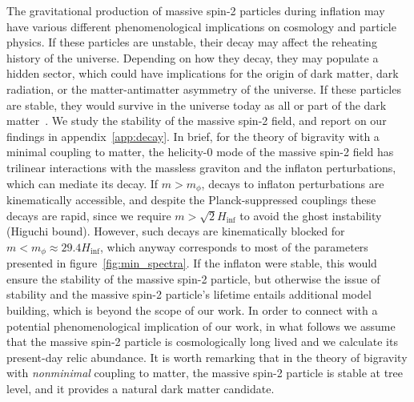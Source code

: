 \documentclass[11pt,a4paper]{article}
\newcommand{\fref}[1]{figure~\ref{#1}}
\newcommand{\aref}[1]{appendix~\ref{#1}}
\begin{document}
The gravitational production of massive spin-2 particles during inflation may have various different phenomenological implications on cosmology and particle physics.  If these particles are unstable, their decay may affect the reheating history of the universe.  Depending on how they decay, they may populate a hidden sector, which could have implications for the origin of dark matter, dark radiation, or the matter-antimatter asymmetry of the universe.  If these particles are stable, they would survive in the universe today as all or part of the dark matter~\cite{Babichev:2016bxi}.  We study the stability of the massive spin-2 field, and report on our findings in \aref{app:decay}.  In brief, for the theory of bigravity with a minimal coupling to matter, the helicity-0 mode of the massive spin-2 field has trilinear interactions with the massless graviton and the inflaton perturbations, which can mediate its decay.  If $m > m_\phi$, decays to inflaton perturbations are kinematically accessible, and despite the Planck-suppressed couplings these decays are rapid, since we require $m > \sqrt{2} H_\mathrm{inf}$ to avoid the ghost instability (Higuchi bound).  However, such decays are kinematically blocked for $m < m_\phi \approx 29.4 H_\mathrm{inf}$, which anyway corresponds to most of the parameters presented in \fref{fig:min_spectra}.  If the inflaton were stable, this would ensure the stability of the massive spin-2 particle, but otherwise the issue of stability and the massive spin-2 particle's lifetime entails additional model building, which is beyond the scope of our work.  In order to connect with a potential phenomenological implication of our work, in what follows we assume that the massive spin-2 particle is cosmologically long lived and we calculate its present-day relic abundance.  It is worth remarking that in the theory of bigravity with \textit{nonminimal} coupling to matter, the massive spin-2 particle is stable at tree level, and it provides a natural dark matter candidate.  
\end{document}
